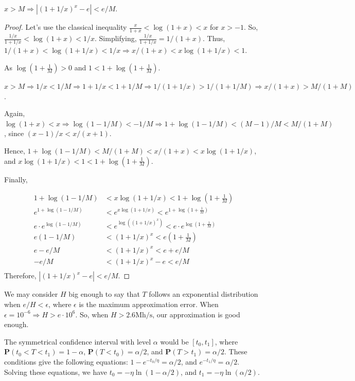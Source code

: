 \begin{theorem}
	$x > M \Rightarrow |(1+1/x)^x - e| < e/M$.
\end{theorem}
\begin{proof}
	Let's use the classical inequality $\frac{x}{1+x} < \log(1+x) < x$ for $x > -1$. So, $\frac{1/x}{1+1/x} < \log(1+x) < 1/x$. Simplifying, $\frac{1/x}{1+1/x} = 1/(1+x)$.  Thus, $1/(1+x) < \log(1+1/x) < 1/x \Rightarrow x/(1+x) < x \log(1 + 1/x) < 1$.

	As $\log(1 + \frac{1}{M}) > 0$ and $1 < 1 + \log(1 + \frac{1}{M})$.

	$x > M \Rightarrow 1/x < 1/M \Rightarrow 1+1/x < 1+1/M \Rightarrow 1/(1+1/x) > 1/(1+1/M) \Rightarrow x/(1+x) > M/(1+M)$.

	Again, $\log(1+x) < x \Rightarrow \log(1-1/M) < -1/M \Rightarrow 1 + \log(1-1/M) < (M-1)/M < M/(1+M)$, since $(x-1)/x < x/(x+1)$.

	Hence, $1 + \log(1-1/M) < M/(1+M) < x/(1+x) < x\log(1+1/x)$, and $x\log(1+1/x) < 1 < 1 + \log(1 + \frac{1}{M})$.

	Finally,

	\begin{align*}
		1 + \log(1-1/M) &< x\log(1+1/x) < 1 + \log(1 + \frac{1}{M}) \\
		e^{1 + \log(1-1/M)} &< e^{x\log(1+1/x)} < e^{1 + \log(1 + \frac{1}{M})} \\
		e \cdot e^{\log(1-1/M)} &< e^{\log((1+1/x)^x)} < e \cdot e^{\log(1 + \frac{1}{M})} \\
		e(1-1/M) &< (1+1/x)^x < e(1 + \frac{1}{M}) \\
		e-e/M &< (1+1/x)^x < e + e/M \\
		-e/M &< (1+1/x)^x - e < e/M \\
	\end{align*}
	Therefore, $\left| \left( 1+1/x \right)^x - e \right| < e/M$.
\end{proof}

We may consider $H$ big enough to say that $T$ follows an exponential distribution when $e/H < \epsilon$, where $\epsilon$ is the maximum approximation error. When $\epsilon = 10^{-6} \Rightarrow H > e \cdot 10^6$. So, when $H > 2.6 \text{Mh/s}$, our approximation is good enough.

The symmetrical confidence interval with level $\alpha$ would be $[t_0, t_1]$, where $\mathbf{P}(t_0 < T < t_1) = 1-\alpha$, $\mathbf{P}(T<t_0) = \alpha/2$, and $\mathbf{P}(T>t_1) = \alpha/2$. These conditions give the following equations: $1 - e^{-t_0/\eta} = \alpha/2$, and $e^{-t_1/\eta} = \alpha/2$. Solving these equations, we have $t_0 = -\eta \ln{(1 - \alpha/2)}$, and $t_1 = -\eta \ln{(\alpha/2)}$.


